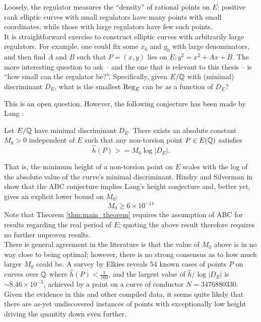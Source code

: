 Loosely, the regulator measures the ``density'' of rational points on $E$: positive rank elliptic curves with small regulators have many points with small coordinates, while those with large regulators have few such points.\\

It is straightforward exercise to construct elliptic curves with arbitrarily large regulators. For example, one could fix some $x_0$ and $y_0$ with large denominators, and then find $A$ and $B$ such that $P=(x,y)$ lies on $E: y^2 = x^2 + Ax + B$. The more interesting question to ask -- and the one that is relevant to this thesis -- is ``how small can the regulator be?''. Specifically, given $E/\mathbb{Q}$ with (minimal) discriminant $D_E$, what is the smallest $\operatorname{Reg}_E$ can be as a function of $D_E$?

This is an open question. However, the following conjecture has been made by Lang \cite{Lang-1997}:

\begin{conjecture}\label{conj:Lang_height}
Let $E/\mathbb{Q}$ have minimal discriminant $D_E$. There exists an absolute constant $M_0 >0$ independent of $E$ such that any non-torsion point $P \in E(\mathbb{Q})$ satisfies
\begin{equation}
\hat{h}(P) >= M_0 \log |D_E| .
\end{equation}
\end{conjecture}
That is, the minimum height of a non-torsion point on $E$ scales with the log of the absolute value of the curve's minimal discriminant. Hindry and Silverman in \cite{HiS-1988} show that the ABC conjecture implies Lang's height conjecture and, better yet, gives an explicit lower bound on $M_0$:
\begin{equation}
M_0 \ge 6\times 10^{-11}
\end{equation}
Note that Theorem \ref{thm:main_theorem} requires the assumption of ABC for results regarding the real period of $E$; quoting the above result therefore requires no further unproven results. \\

There is general agreement in the literature is that the value of $M_0$ above is in no way close to being optimal; however, there is no strong consensus as to how much larger $M_0$ could be. A survey by Elkies \cite{ElSt-2002} reveals 54 known cases of points $P$ on curves over $\mathbb{Q}$ where $\hat{h}(P) < \frac{1}{100}$, and the largest value of $\hat{h}/\log|D_E|$ is $\sim 8.46 \times 10^{-5}$, achieved by a point on a curve of conductor $N=3476880330$. Given the evidence in this and other compiled data, it seems quite likely that there are as-yet undiscovered instances of points with exceptionally low height driving the quantity down even further. \\

